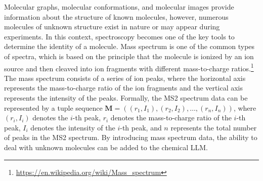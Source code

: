 Molecular graphs, molecular conformations, and molecular images provide information about the structure of known molecules, however, numerous molecules of unknown structure exist in nature or may appear during experiments. In this context, spectroscopy becomes one of the key tools to determine the identity of a molecule. Mass spectrum is one of the common types of spectra, which is based on the principle that the molecule is ionized by an ion source and then cleaved into ion fragments with different mass-to-charge ratios.\footnote{\url{https://en.wikipedia.org/wiki/Mass_spectrum}} The mass spectrum consists of a series of ion peaks, where the horizontal axis represents the mass-to-charge ratio of the ion fragments and the vertical axis represents the intensity of the peaks. Formally, the MS2 spectrum data can be represented by a tuple sequence $\mathbf{M} = ((r_1, I_1), (r_2, I_2), \dots, (r_n, I_n))$, where $(r_i, I_i)$ denotes the $i$-th peak, $r_i$ denotes the mass-to-charge ratio of the $i$-th peak, $I_i$ denotes the intensity of the $i$-th peak, and $n$ represents the total number of peaks in the MS2 spectrum. By introducing mass spectrum data, the ability to deal with unknown molecules can be added to the chemical LLM.

